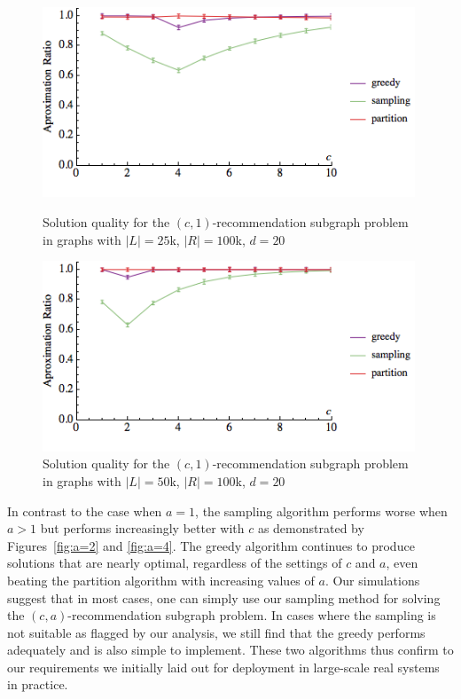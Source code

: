 \begin{figure}
\centering
\begin{minipage}[h]{0.48\textwidth}
\centering
\includegraphics[width=0.99\textwidth]{images/l=25000,r=100000_Greedy_vs_Naive_error.png}
\vspace{-1cm}
\caption{Solution quality for the $(c, 1)$-recommendation subgraph problem in graphs with $|L|=25$k, $|R|=100$k, $d=20$}\label{fig:a=1:1}
\end{minipage}
\vspace{.2cm}
\hspace{0cm}
\begin{minipage}[h]{0.48\textwidth}
\centering
\includegraphics[width=0.99\textwidth]{images/l=50000,r=100000_Greedy_vs_Naive_error.png}
\vspace{-1cm}
\caption{Solution quality for the $(c, 1)$-recommendation subgraph problem in graphs with $|L|=50$k, $|R|=100$k, $d=20$}\label{fig:a=1:2}
\end{minipage}
\vspace{-.8cm}
\end{figure}

In contrast to the case when $a=1$, the sampling algorithm
performs worse when $a>1$ but performs increasingly better with $c$ as
demonstrated by Figures~\ref{fig:a=2} and \ref{fig:a=4}. The greedy
algorithm continues to produce solutions that are nearly optimal,
regardless of the settings of $c$ and $a$, even beating the
partition algorithm with increasing values of $a$. Our simulations
suggest that in most cases, one can simply use our sampling method for solving the $(c, a)$-recommendation subgraph problem. In cases where the sampling is not suitable as flagged
by our analysis, we still find that the greedy performs adequately and
is also simple to implement. These two algorithms thus confirm to our
requirements we initially laid out for deployment in large-scale real
systems in practice.


